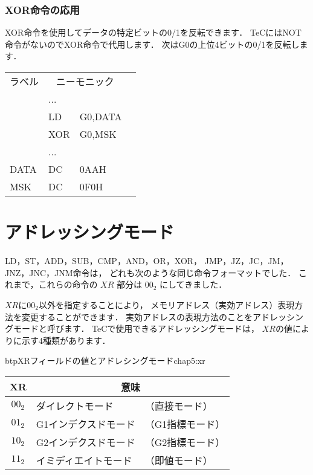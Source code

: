 \subsubsection{XOR命令の応用}
XOR命令を使用してデータの特定ビットの0/1を反転できます．
TeCにはNOT命令がないのでXOR命令で代用します．
次はG0の上位4ビットの0/1を反転します．

{\ttfamily\small\begin{center}
  \begin{tabular}{|l|l l|l}
    \cline{1-3}
    ラベル & \multicolumn{2}{|c|}{ニーモニック} & \\
    \cline{1-3}
    & ...  &        & \\
    & LD   & G0,DATA& \\
    & XOR  & G0,MSK & \\
    & ...  &        & \\
    DATA& DC   & 0AAH    & \\
    MSK & DC   & 0F0H    & \\
    \cline{1-3}
  \end{tabular}
\end{center}}

\begin{center}
\end{center}

\newpage
\section{アドレッシングモード}
LD，ST，ADD，SUB，CMP，AND，OR，XOR，
JMP，JZ，JC，JM，JNZ，JNC，JNM命令は，
どれも次のような同じ命令フォーマットでした．
これまで，これらの命令の $XR$ 部分は $00_2$ にしてきました．

\twoByte{\OP}{\GR~\XR}{\A}

$XR$に$00_2$以外を指定することにより，
メモリアドレス（実効アドレス）表現方法を変更することができます．
実効アドレスの表現方法のことをアドレッシングモードと呼びます．
TeCで使用できるアドレッシングモードは，
$XR$の値によりに示す4種類があります．

\begin{mytable}{btp}{XRフィールドの値とアドレシングモード}{chap5:xr}
  {\small\begin{center}
    \begin{tabular}{c|l l}
      \hline
      \hline
      XR & \multicolumn{2}{|c}{意味} \\
      \hline
      $00_2$ & ダイレクトモード     & （直接モード）   \\
      $01_2$ & G1インデクスドモード & （G1指標モード） \\
      $10_2$ & G2インデクスドモード & （G2指標モード） \\
      $11_2$ & イミディエイトモード & （即値モード）   \\
    \end{tabular}
  \end{center}}
\end{mytable}

